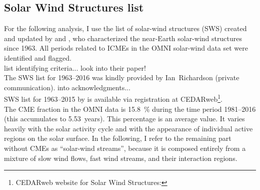 \subsection{Solar Wind Structures list}
For the following analysis, I use the list of solar-wind structures (SWS) created and updated by \citet{Richardson2000} and \citet{Richardson2012}, who characterized the near-Earth solar-wind structures since 1963. All periods related to ICMEs in the OMNI solar-wind data set were identified and flagged.\\

list identifying criteria... look into their paper!\\

The SWS list for 1963--2016 was kindly provided by Ian~Richardson (private communication). into acknowledgments...\\

SWS list for 1963--2015 by \citep{Richardson2000,Richardson2012} is available via registration at CEDARweb\footnote{CEDARweb website for Solar Wind Structures: }.\\

The CME fraction in the OMNI data is \SI{15.8}{\%} during the time period 1981--2016 (this accumulates to 5.53~years).
This percentage is an average value. It varies heavily with the solar activity cycle and with the appearance of individual active regions on the solar surface. In the following, I refer to the remaining part without CMEs as ``solar-wind streams'', because it is composed entirely from a mixture of slow wind flows, fast wind streams, and their interaction regions.


